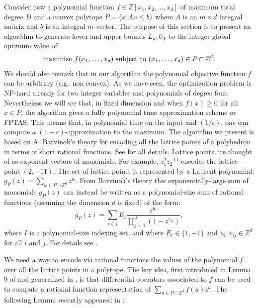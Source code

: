 \documentclass[twoside]{article}
\newcommand{\Z}{\mathbb Z}
\newcommand{\1}{{\bf 1}}
\begin{document}
Consider now a polynomial function $f \in
\Z[x_1,x_2, \dots ,x_d]$ of maximum total degree $D$ and a
convex polytope $P=\{x | Ax \leq b\}$ where $A$ is an $m \times
d$ integral matrix and $b$ is an integral $m$-vector. The purpose of this
section is to present an algorithm to generate lower and upper bounds
$L_k,U_k$ to the integer global optimum value of
\begin{equation} 
\hbox{maximize} \ f(x_1,\dots,x_d) \  \hbox
{subject to} \  (x_1,\dots,x_d) \in P \cap \Z^d. 
\end{equation}
We should also remark that in our algorithm the polynomial objective
function $f$ can be arbitrary (e.g.\ non-convex). As we have seen, the
optimization problem is NP-hard already for two integer variables and
polynomials of degree four. Nevertheless we will see that, in fixed
dimension and when $f(x) \geq 0$ for all $x \in P$, the algorithm gives a
fully polynomial time approximation scheme or FPTAS. This means that,
in polynomial time on the input and $(1/\epsilon)$, one can compute a
$(1-\epsilon)$-approximation to the maximum. The algorithm we present
is based on A. Barvinok's theory for encoding all the lattice points
of a polyhedron in terms of short rational functions. See
\cite{bar,BarviPom} for all details.  Lattice points are thought of as
exponent vectors of monomials.  For example, $z_1^2z_2^{-11}$ encodes
the lattice point $(2,-11)$.  The set of lattice points is represented
by a Laurent polynomial: $g_P(z)=\sum_{\alpha \in P\cap\Z^d}
z^\alpha.$ From Barvinok's theory this exponentially-large sum of
monomials $g_P(z)$ can instead be written as a polynomial-size sum of
rational functions (assuming the dimension $d$ is fixed) of the form:
\begin{equation} \label{eq:aa}
g_P(z) = \sum_{i\in I} {E_i \frac{z^{u_i}} {\prod\limits_{j=1}^d
(1-z^{v_{ij}})}},
\end{equation}
where $I$ is a polynomial-size indexing set, and where
$E_i\in\{1,-1\}$ and $u_i, v_{ij} \in\Z^d$ for all $i$ and $j$. For
details see \cite{BarviPom,latte1,latte2}.

We need a way to encode via rational functions the values of the
polynomial $f$ over all the lattice points in a polytope.  The key
idea, first introduced in Lemma 9 of \cite{latte2} and generalized in
\cite{hugginsthesis}, is that differential operators associated to $f$
can be used to compute a rational function representation of
$\sum_{a\in P \cap \Z^d} f(a) z^a.$ The following Lemma recently
appeared in \cite{newbar}:
\end{document}
